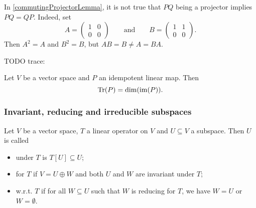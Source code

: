 \begin{example}
In \ref{commutingProjectorLemma}, it is not true that $PQ$ being a projector implies $PQ = QP$. Indeed, set
\[ A = \begin{pmatrix}
1 & 0 \\ 0 & 0
\end{pmatrix}\qquad \text{and}\qquad B = \begin{pmatrix}
1 & 1 \\ 0 & 0
\end{pmatrix}. \]
Then $A^2 = A$ and $B^2 = B$, but $AB = B \neq A = BA$.
\end{example}


TODO trace:
\begin{lemma}
Let $V$ be a vector space and $P$ an idempotent linear map. Then
\[ \operatorname{Tr}(P) = \dim(\operatorname{im}(P)). \]
\end{lemma}


\subsubsection{Invariant, reducing and irreducible subspaces}
\begin{definition}
Let $V$ be a vector space, $T$ a linear operator on $V$ and $U\subseteq V$ a subspace. Then $U$ is called
\begin{itemize}
    \item {} under $T$ is $T[U]\subseteq U$;
    \item {} for $T$ if $V = U\oplus W$ and both $U$ and $W$ are invariant under $T$;
    \item {} w.r.t. $T$ if for all $W\subseteq U$ such that $W$ is reducing for $T$, we have $W = U$ or $W = \emptyset$.
\end{itemize}
\end{definition}

